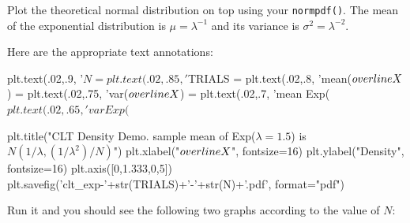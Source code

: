 \begin{fullwidth}
\step Plot the theoretical normal distribution on top using your {\tt normpdf()}. The mean of the exponential distribution is $\mu = \lambda^{-1}$ and its variance is $\sigma^2 = \lambda^{-2}$.

\step Here are the appropriate text annotations:

{\small
\begin{pyverbatim}
plt.text(.02,.9, '$N = %
plt.text(.02,.85, '$TRIALS = %
plt.text(.02,.8,   'mean($\\overline{X}$) = %
plt.text(.02,.75, 'var($\\overline{X}$) = %
plt.text(.02,.7, 'mean Exp($%
plt.text(.02,.65, 'var Exp($%

plt.title("CLT Density Demo. sample mean of Exp($\lambda=1.5$) is $N(1/\lambda, (1/\lambda^2)/N)$")
plt.xlabel("$\\overline{X}$", fontsize=16)
plt.ylabel("Density", fontsize=16)
plt.axis([0,1.333,0,5])
plt.savefig('clt_exp-'+str(TRIALS)+'-'+str(N)+'.pdf', format="pdf")
\end{pyverbatim}
}

\step Run it and you should see the following two graphs according to the value of $N$:


\end{fullwidth}
